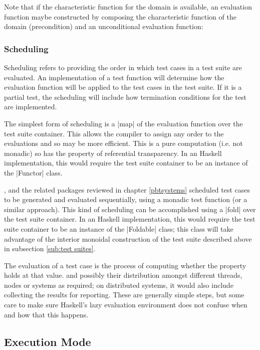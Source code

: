 Note that if the characteristic function for the domain is available,
an evaluation function maybe constructed by composing
the characteristic function of the domain (precondition) and 
an unconditional evaluation function:


\subsubsection{Scheduling}
Scheduling refers to providing the order in which test cases in a test suite are evaluated.
An implementation of a test function will
determine how the evaluation function will be applied
to the test cases in the test suite.
If it is a partial test, the scheduling will include
how termination conditions for the test are implemented.

The simplest form of scheduling is 
a |map| of the evaluation function
over the test suite container.
This allows the compiler to assign any order
to the evaluations and so may be more efficient.
This is a pure computation (i.e. not monadic) 
so has the property of referential transparency.
In an Haskell implementation,
this would require the test suite container to be an instance of the |Functor| class.

\QC, \SC and the related packages reviewed in chapter \ref{pbtsystems}
scheduled test cases to be generated and evaluated sequentially,
using a monadic test function (or a similar approach).
This kind of scheduling can be accomplished using 
a |fold| over the test suite container.
In an Haskell implementation,
this would require the test suite container to be an instance of the |Foldable| class;
this class will take advantage of the interior monoidal construction of the test suite
described above in subsection \ref{sub:test suites}.

The evaluation of a test case is the process of computing 
whether the property holds at that value.
and possibly their distribution amongst different threads, nodes or systems as required;
on distributed systems, it would also include collecting the results for reporting.
These are generally simple steps,
but some care to make sure
Haskell's lazy evaluation environment does not confuse 
when and how that this happens.

\subsection{Execution Mode}

